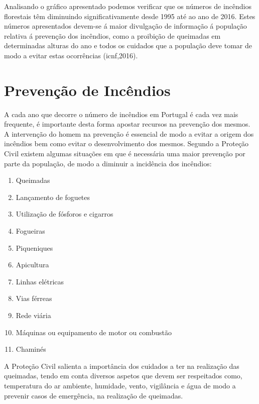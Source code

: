 \documentclass{report}
\begin{document}
Analisando o gráfico apresentado podemos verificar que os números de incêndios florestais têm diminuindo significativamente desde 1995 até ao ano de 2016. Estes números apresentados devem-se á maior divulgação de informação á população relativa á prevenção dos incêndios, como a proibição de queimadas em determinadas alturas do ano e todos os cuidados que a população deve tomar de modo a evitar estas ocorrências (\ac{icnf},2016).


\chapter{Prevenção de Incêndios}
\label{prevenção de incêndios}
\cite{dgsefeitos-fumo}

A cada ano que decorre o número de incêndios em Portugal é cada vez mais frequente, é importante desta forma apostar recursos na prevenção dos mesmos. A intervenção do homem na prevenção é essencial de modo a evitar a origem dos incêndios bem como evitar o desenvolvimento dos mesmos. Segundo a Proteção Civil existem algumas situações em que é necessária uma maior prevenção por parte da população, de modo a diminuir a incidência dos incêndios:
\begin{enumerate}
 \item Queimadas
 \item Lançamento de foguetes
 \item Utilização de fósforos e cigarros
 \item Fogueiras
 \item Piqueniques
 \item Apicultura
 \item Linhas elétricas
 \item Vias férreas
 \item Rede viária
 \item Máquinas ou equipamento de motor ou combustão
 \item Chaminés
\end{enumerate}

A Proteção Civil salienta a importância dos cuidados a ter na realização das queimadas, tendo em conta diversos aspetos que devem ser respeitados como, temperatura do ar ambiente, humidade, vento, vigilância e água de modo a prevenir casos de emergência, na realização de queimadas.

\end{document}
